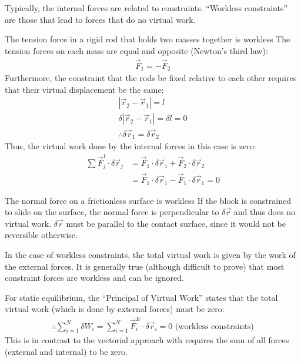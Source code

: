 Typically, the internal forces are related to constraints. ``Workless constraints'' are those that lead to forces that do no virtual work.
\begin{example}{0pt}{The tension force in a rigid rod that holds two masses together is workless}{}
The tension forces on each mass are equal and opposite (Newton's third law):
\begin{align*}
\vec{F}_1=-\vec{F}_2
\end{align*}
Furthermore, the constraint that the rods be fixed relative to each other requires that their virtual displacement be the same:
\begin{align*}
\left|\vec{r}_2-\vec{r}_1\right|=l\nonumber\\
\delta \left|\vec{r}_2-\vec{r}_1\right|=\delta l=0\nonumber\\
\therefore \delta\vec{r}_1=\delta \vec{r}_2
\end{align*}
Thus, the virtual work done by the internal forces in this case is zero:
\begin{align*}
\sum\vec{F}^I_j\cdot\delta\vec{r}_j&=\vec{F}_1\cdot\delta\vec{r}_1+\vec{F}_2\cdot\delta\vec{r}_2\nonumber\\
&=\vec{F}_1\cdot\delta\vec{r}_1-\vec{F}_1\cdot\delta\vec{r}_1=0
\end{align*}
\end{example}
\begin{example}{0pt}{The normal force on a frictionless surface is workless}{}
If the block is constrained to slide on the surface, the normal force is perpendicular to $\delta \vec{r}$ and thus does no virtual work. $\delta \vec{r}$ must be parallel to the contact surface, since it would not be reversible otherwise.
\end{example}

In the case of workless constraints, the total virtual work is given by the work of the external forces. It is generally true (although difficult to prove) that most constraint forces are workless and can be ignored.

For static equilibrium, the ``Principal of Virtual Work'' states that the total virtual work (which is done by external forces) must be zero:
\begin{align}
\therefore \sum_{i=1}^N\delta W_i=\sum_{i=1}^N \vec{F}^E_i\cdot\delta\vec{r}_i = 0 \text{   (workless constraints)}
\end{align}
This is in contrast to the vectorial approach with requires the sum of all forces (external and internal) to be zero.

